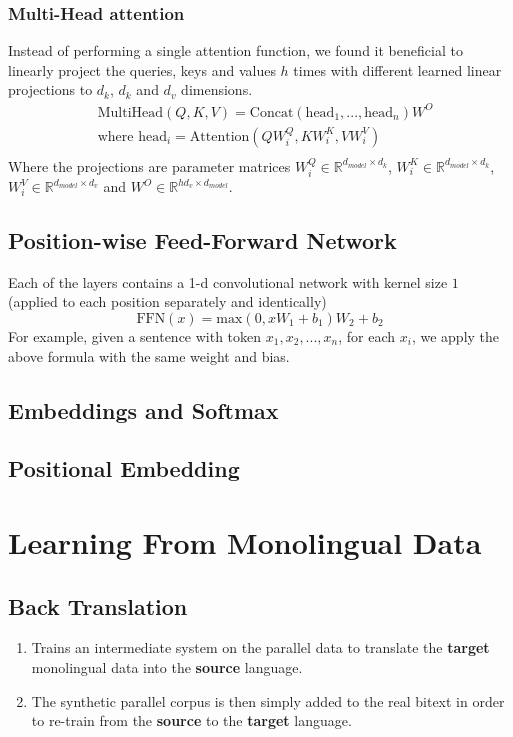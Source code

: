 \documentclass[a3paper, 12pt]{book} %
\begin{document}
\subsubsection{Multi-Head attention}
Instead of performing a single attention function, we found it beneficial to linearly project the queries, keys and values $h$ times with different learned linear projections to $d_k$, $d_k$ and $d_v$ dimensions.
\begin{equation}
\begin{split}
& \text{MultiHead}(Q,K,V)=\text{Concat}(\text{head}_1, ...,\text{head}_n) W^O \\
& \text{where } \text{head}_i = \text{Attention}(QW_i^Q, KW_i^K, VW_i^V)  \\
\end{split}
\end{equation}
Where the projections are parameter matrices $W_i^Q \in \mathbb{R}^{d_{model}\times d_k}$,  $W_i^K \in \mathbb{R}^{d_{model}\times d_k}$,  $W_i^V \in \mathbb{R}^{d_{model}\times d_v}$ and $W^O \in \mathbb{R}^{hd_v \times d_{model}} $.

\subsection{Position-wise Feed-Forward Network}
Each of the layers contains a 1-d convolutional network with kernel size $1$ (applied to each position separately and identically)
\begin{equation}
\text{FFN}(x) = \text{max}(0, xW_1+b_1)W_2+b_2
\end{equation}
For example, given a sentence with token $x_1, x_2,..., x_n$, for each $x_i$, we apply the above formula with the same weight and bias.

\subsection{Embeddings and Softmax}

\subsection{Positional Embedding}

\section{Learning From Monolingual Data}
\subsection{Back Translation}
\begin{enumerate}
\item Trains an intermediate system on the parallel data to translate the \textbf{target} monolingual data into
the \textbf{source} language. 
\item The synthetic parallel corpus is then
simply added to the real bitext in order to re-train from the \textbf{source}
to the \textbf{target} language.
\end{enumerate}
\end{document}
